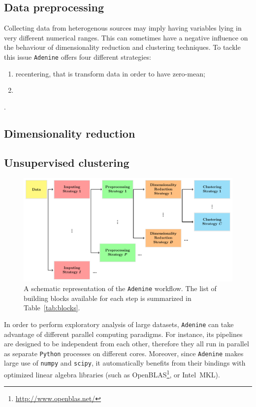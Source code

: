 \documentclass[twoside,11pt]{article}
\makeatletter
\newcommand{\ade}{\texttt{Adenine}\@\xspace}
\newcommand{\py}{\texttt{Python}\@\xspace}
\makeatother
\begin{document}
\subsection*{Data preprocessing}
Collecting data from heterogenous sources may imply having variables lying in very different numerical ranges. This can sometimes have a negative influence on the behaviour of dimensionality reduction and clustering techniques. To tackle this issue \ade offers four different strategies:
\begin{enumerate}[label=(\roman*)]
  \item recentering, that is transform data in order to have zero-mean;
  \item 
\end{enumerate}.

\subsection*{Dimensionality reduction}
\subsection*{Unsupervised clustering}


\begin{figure}[h!]
    \centering
    \includegraphics[width=\textwidth]{ade_wf/ade_wf.pdf}
    \caption{A schematic representation of the \ade workflow. The list of building blocks available for each step is summarized in Table~\ref{tab:blocks}.}\label{fig:workflow}
\end{figure}


In order to perform exploratory analysis of large datasets, \ade can take advantage of different parallel computing paradigms. For instance, its pipelines are designed to be independent from each other, therefore they all run in parallel as separate \py processes on different cores. Moreover, since \ade makes large use of \texttt{numpy} and \texttt{scipy}, it automatically benefits from their bindings with optimized linear algebra libraries (such as OpenBLAS\footnote{\href{http://www.openblas.net/}{http://www.openblas.net/}}, or Intel\textsuperscript{\textregistered}~MKL).
\end{document}
